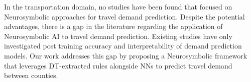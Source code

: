 








In the transportation domain, no studies have been found that focused on Neurosymbolic approaches for travel demand prediction. Despite the potential advantages, there is a gap in the literature regarding the application of Neurosymbolic AI to travel demand prediction. Existing studies have only investigated post training accuracy and interpretability of demand prediction models. Our work addresses this gap by proposing a Neurosymbolic framework that leverages DT-extracted rules alongside NNs to predict travel demand between counties.
